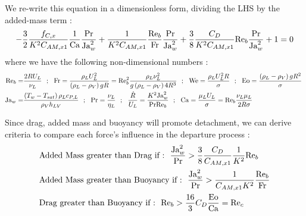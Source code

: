 We re-write this equation in a dimensionless form, dividing the LHS by the added-mass term :
\begin{equation}
-\frac{3}{2}\frac{f_{C,x}}{K^{2}C_{AM,x1}}\frac{1}{\mathrm{Ca}}\frac{\mathrm{Pr}}{\mathrm{Ja}_{w}^{2}} + \frac{1}{K^{2}C_{AM,x1}}\frac{\mathrm{Re}_{b}}{\mathrm{Fr}}\frac{\mathrm{Pr}}{\mathrm{Ja}_{w}^{2}} + \frac{3}{8}\frac{C_{D}}{K^{2}C_{AM,x1}}\mathrm{Re}_{b}\frac{\mathrm{Pr}}{\mathrm{Ja}_{w}^{2}} +1 =0
\label{eq:adim_bdf}
\end{equation}
where we have the following non-dimensional numbers :
\begin{align}
\nonumber \Re_{b} =& \frac{2RU_{L}}{\nu_{L}}\ \ ;\ \ \Fr=\frac{\rho_{L}U_{L}^{2}}{\parth{\rho_{L}-\rho_{V}}g R}=\Re_{b}^{2}\frac{\rho_{L}\nu_{L}^{2} }{g\parth{\rho_{L}-\rho_{V}}4R^{3}} \ \ ;\ \ \We=\frac{\rho_{L}U_{L}^{2}R}{\sigma}\ \ ;\ \ \Eo=\frac{\parth{\rho_{L}-\rho_{V}}g R^{2}}{\sigma}\ \\ \Ja_{w}=&\frac{\parth{T_{w}-T_{sat}}\rho_{L} c_{P,L}}{\rho_{V} h_{LV}}\ \ ;\ \ \Pr=\frac{\nu_{L}}{\eta_{L}}\ \ ;\ \ \frac{\dot{R}}{U_{L}}=\frac{K^{2}\Ja_{w}^{2}}{\Pr \Re_{b}}\ \ ;\ \ \Ca=\frac{\mu_{L}U_{L}}{\sigma}=\Re_{b} \frac{\nu_{L}\mu_{L}}{2R\sigma}
\end{align}

Since drag, added mass and buoyancy will promote detachment, we can derive criteria to compare each force's influence in the departure process :
\begin{align}
&\text{Added Mass greater than Drag if :}\ \ \frac{\Ja_{w}^{2}}{\Pr}>\frac{3}{8}\frac{C_{D}}{C_{AM,x1}}\frac{1}{K^{2}}\Re_{b} \label{eq:AMvsD}\\
&\text{Added Mass greater than Buoyancy if :}\ \  \frac{\Ja_{w}^{2}}{\Pr}>\frac{1}{C_{AM,x1}K^{2}}\frac{\Re_{b}}{\Fr} \label{eq:AMvsB}\\
&\text{Drag greater than Buoyancy if :}\ \  \Re_{b}>\frac{16}{3}C_{D}\frac{\Eo}{\Ca}=\Re_{c} \label{eq:DvsB}
\end{align}


